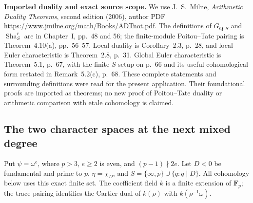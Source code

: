 \documentclass[11pt,a4paper]{article}
\theoremstyle{definition}
\renewcommand{\paragraph}[1]{\par\smallskip\noindent\textbf{#1}\quad\ignorespaces}
\newcommand{\Sha}{\operatorname{Sha}}
\begin{document}
\paragraph{Imported duality and exact source scope.}
We use J.~S.~Milne, \emph{Arithmetic Duality Theorems},
second edition (2006), author PDF
\url{https://www.jmilne.org/math/Books/ADTnot.pdf}.
The definitions of $G_{\mathbf Q,S}$ and $\Sha^r_S$ are in
Chapter~I, pp.~48 and 56; the finite-module Poitou--Tate
pairing is Theorem~4.10(a), pp.~56--57.
Local duality is Corollary~2.3, p.~28, and local Euler
characteristic is Theorem~2.8, p.~31.
Global Euler characteristic is Theorem~5.1, p.~67, with
the finite-$S$ setup on p.~66 and its useful cohomological
form restated in Remark~5.2(c), p.~68.
These complete statements and surrounding definitions were
read for the present application.  Their foundational proofs
are imported as theorems; no new proof of Poitou--Tate duality
or arithmetic comparison with etale cohomology is claimed.



\subsection{The two character spaces at the next mixed degree}
\label{sec:kt-cubic-cohomology}

Put $\psi=\omega^e$, where $p>3$, $e\ge2$ is even, and
$(p-1)\nmid2e$.  Let $D<0$ be fundamental and prime to $p$,
$\eta=\chi_D$, and
$S=\{\infty,p\}\cup\{q:q\mid D\}$.  All cohomology below uses
this exact finite set.  The coefficient field $k$ is a finite extension
of $\mathbf F_p$; the trace pairing identifies the Cartier dual of
$k(\rho)$ with $k(\rho^{-1}\omega)$.
\end{document}
